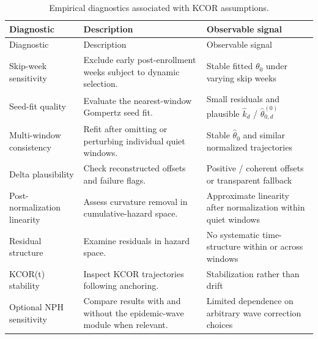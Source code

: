 \documentclass[
]{article}
\begin{document}
\begin{longtable}[]{@{}
  >{\raggedright\arraybackslash}p{}
  >{\raggedright\arraybackslash}p{}
  >{\raggedright\arraybackslash}p{}@{}}
\caption{Empirical diagnostics associated with KCOR
assumptions.}\label{tbl:si_diagnostics}\tabularnewline
\toprule\noalign{}
\begin{minipage}[b]{\linewidth}\raggedright
Diagnostic
\end{minipage} & \begin{minipage}[b]{\linewidth}\raggedright
Description
\end{minipage} & \begin{minipage}[b]{\linewidth}\raggedright
Observable signal
\end{minipage} \\
\midrule\noalign{}
\endfirsthead
\toprule\noalign{}
\begin{minipage}[b]{\linewidth}\raggedright
Diagnostic
\end{minipage} & \begin{minipage}[b]{\linewidth}\raggedright
Description
\end{minipage} & \begin{minipage}[b]{\linewidth}\raggedright
Observable signal
\end{minipage} \\
\midrule\noalign{}
\endhead
\bottomrule\noalign{}
\endlastfoot
Skip-week sensitivity & Exclude early post-enrollment weeks subject to
dynamic selection. & Stable fitted \(\theta_0\) under varying skip
weeks \\
Seed-fit quality & Evaluate the nearest-window Gompertz seed fit. &
Small residuals and plausible \(\hat{k}_d\) /
\(\hat{\theta}_{0,d}^{(0)}\) \\
Multi-window consistency & Refit after omitting or perturbing individual
quiet windows. & Stable \(\hat{\theta}_0\) and similar normalized
trajectories \\
Delta plausibility & Check reconstructed offsets and failure flags. &
Positive / coherent offsets or transparent fallback \\
Post-normalization linearity & Assess curvature removal in
cumulative-hazard space. & Approximate linearity after normalization
within quiet windows \\
Residual structure & Examine residuals in hazard space. & No systematic
time-structure within or across windows \\
KCOR(t) stability & Inspect KCOR trajectories following anchoring. &
Stabilization rather than drift \\
Optional NPH sensitivity & Compare results with and without the
epidemic-wave module when relevant. & Limited dependence on arbitrary
wave correction choices \\
\end{longtable}
\end{document}
